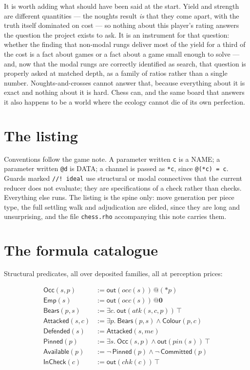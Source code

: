 \documentclass[11pt,a4paper]{article}
\makeatletter
\theoremstyle{plain}
\theoremstyle{definition}
\theoremstyle{remark}
\newcommand{\Nil}{\mathbf{0}}
\newcommand{\out}{\mathsf{out}}
\newcommand{\qt}[1]{\ensuremath{@#1}}
\makeatother
\begin{document}
It is worth adding what should have been said at the start. Yield and strength
are different quantities --- the noughts result \emph{is} that they come apart,
with the truth itself dominated on cost --- so nothing about this player's
rating answers the question the project exists to ask. It is an instrument for
that question: whether the finding that non-modal rungs deliver most of the yield for
a third of the cost is a fact about games or a fact about a game small enough to
solve --- and, now that the modal rungs are correctly identified as search, that
question is properly asked at matched depth, as a family of ratios rather than a
single number. Noughts-and-crosses cannot answer that, because everything about it is
exact and nothing about it is hard. Chess can, and the same board that answers
it also happens to be a world where the ecology cannot die of its own
perfection.

\appendix

\section{The listing}
\label{app:rho}

Conventions follow the game note. A parameter written \texttt{c} is a NAME; a
parameter written \texttt{@d} is DATA; a channel is passed as \texttt{*c}, since
\texttt{@(*c) = c}. Guards marked \texttt{//! ideal} use structural or modal
connectives that the current reducer does not evaluate; they are specifications
of a check rather than checks. Everything else runs. The listing is the spine
only: move generation per piece type, the full settling walk and adjudication are
elided, since they are long and unsurprising, and the file
\texttt{chess.rho} accompanying this note carries them.



\section{The formula catalogue}
\label{app:formulae}

Structural predicates, all over deposited families, all at perception prices:

\begin{align*}
  \mathsf{Occ}(s,p) &:= \out(\mathit{occ}(s))\,\qt{(*p)} \\
  \mathsf{Emp}(s) &:= \out(\mathit{occ}(s))\,\qt{\Nil} \\
  \mathsf{Bears}(p,s) &:= \exists c.\ \out(\mathit{atk}(s,c,p))\,\top \\
  \mathsf{Attacked}(s,c) &:= \exists p.\ \mathsf{Bears}(p,s) \wedge \mathsf{Colour}(p,c) \\
  \mathsf{Defended}(s) &:= \mathsf{Attacked}(s,\mathit{me}) \\
  \mathsf{Pinned}(p) &:= \exists s.\ \mathsf{Occ}(s,p) \wedge \out(\mathit{pin}(s))\,\top \\
  \mathsf{Available}(p) &:= \neg\,\mathsf{Pinned}(p) \wedge \neg\,\mathsf{Committed}(p) \\
  \mathsf{InCheck}(c) &:= \out(\mathit{chk}(c))\,\top
\end{align*}
\end{document}
